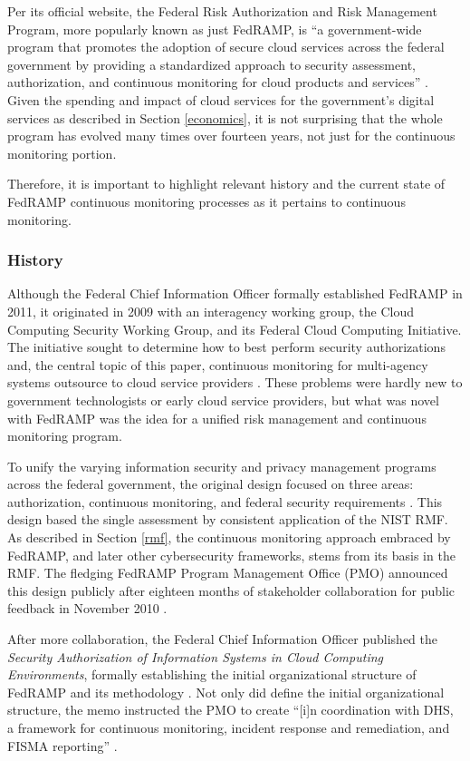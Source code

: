 \documentclass{jdf}
\begin{document}
Per its official website, the Federal Risk Authorization and Risk Management Program, more popularly known as just FedRAMP, is ``a government-wide program that promotes the adoption of secure cloud services across the federal government by providing a standardized approach to security assessment, authorization, and continuous monitoring for cloud products and services'' \citeyear{fedramp_definition25}. Given the spending and impact of cloud services for the government's digital services as described in Section \ref{economics}, it is not surprising that the whole program has evolved many times over fourteen years, not just for the continuous monitoring portion.

Therefore, it is important to highlight relevant history and the current state of FedRAMP continuous monitoring processes as it pertains to continuous monitoring.

\subsubsection{History} \label{fedramp_history}

Although the Federal Chief Information Officer formally established FedRAMP in 2011, it originated in 2009 with an interagency working group, the Cloud Computing Security Working Group, and its Federal Cloud Computing Initiative. The initiative sought to determine how to best perform security authorizations and, the central topic of this paper, continuous monitoring for multi-agency systems outsource to cloud service providers \cite[p.~239]{metheny17}. These problems were hardly new to government technologists or early cloud service providers, but what was novel with FedRAMP was the idea for a unified risk management and continuous monitoring program.

To unify the varying information security and privacy management programs across the federal government, the original design focused on three areas: authorization, continuous monitoring, and federal security requirements \cite[p.~240]{metheny17}. This design based the single assessment by consistent application of the NIST RMF. As described in Section \ref{rmf}, the continuous monitoring approach embraced by FedRAMP, and later other cybersecurity frameworks, stems from its basis in the RMF. The fledging FedRAMP Program Management Office (PMO) announced this design publicly after eighteen months of stakeholder collaboration for public feedback in November 2010 \cite[p.~240]{metheny17}.

After more collaboration, the Federal Chief Information Officer published the \textit{Security Authorization of Information Systems in Cloud Computing Environments}, formally establishing the initial organizational structure of FedRAMP and its methodology \cite[p.~241]{metheny17}. Not only did define the initial organizational structure, the memo instructed the PMO to create ``[i]n coordination with DHS, a framework for continuous monitoring, incident response and remediation, and FISMA reporting'' \citeyear[p.~3]{secauthmemo11}.
\end{document}
